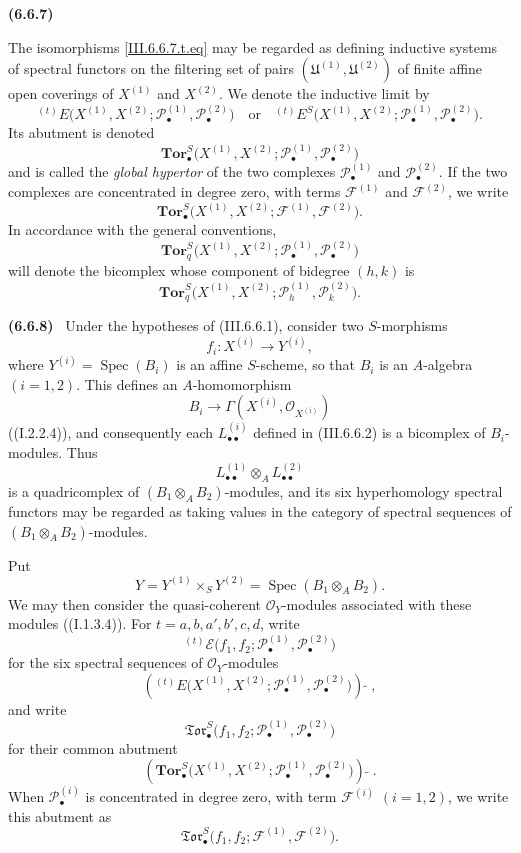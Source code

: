 \documentclass[10pt,oneside]{book}
\newcommand{\sh}[1]{\mathscr{#1}}
\newcommand{\supertilde}{{\,\widetilde{\,}\,}}
\newcommand{\Spec}{\operatorname{Spec}}
\newcommand{\sref}[2][]{(#2)}
\newcommand{\oldpage}[2][]{\setcounter{footnote}{0}\marginpar{\scriptsize\textbf{#1}~|~#2}\ignorespaces}
\newenvironment{env}[1][]{\par\medskip\noindent\textbf{(#1)}\ }{\par}
\begin{document}
\begin{env}[6.6.7]
\oldpage[III]{157}

The isomorphisms \eqref{III.6.6.7.t.eq} may be regarded as
defining inductive systems of spectral functors on the filtering
set of pairs
$(\mathfrak U^{(1)},\mathfrak U^{(2)})$ of finite affine open
coverings of $X^{(1)}$ and $X^{(2)}$.  We denote the inductive
limit by
\[
  {}^{(t)}E
  \bigl(
    X^{(1)},X^{(2)};
    \sh P_\bullet^{(1)},\sh P_\bullet^{(2)}
  \bigr)
  \quad\text{or}\quad
  {}^{(t)}E^S
  \bigl(
    X^{(1)},X^{(2)};
    \sh P_\bullet^{(1)},\sh P_\bullet^{(2)}
  \bigr).
\]
Its abutment is denoted
\[
  \mathbf{Tor}_\bullet^S
  \bigl(
    X^{(1)},X^{(2)};
    \sh P_\bullet^{(1)},\sh P_\bullet^{(2)}
  \bigr)
\]
and is called the \emph{global hypertor} of the two complexes
$\sh P_\bullet^{(1)}$ and $\sh P_\bullet^{(2)}$.  If the two
complexes are concentrated in degree zero, with terms
$\sh F^{(1)}$ and $\sh F^{(2)}$, we write
\[
  \mathbf{Tor}_\bullet^S
  \bigl(
    X^{(1)},X^{(2)};
    \sh F^{(1)},\sh F^{(2)}
  \bigr).
\]
In accordance with the general conventions,
\[
  \mathbf{Tor}_q^S
  \bigl(
    X^{(1)},X^{(2)};
    \sh P_\bullet^{(1)},\sh P_\bullet^{(2)}
  \bigr)
\]
will denote the bicomplex whose component of bidegree $(h,k)$ is
\[
  \mathbf{Tor}_q^S
  \bigl(
    X^{(1)},X^{(2)};
    \sh P_h^{(1)},\sh P_k^{(2)}
  \bigr).
\]
\end{env}

\begin{env}[6.6.8]
\label{III.6.6.8}
Under the hypotheses of \sref{III.6.6.1}, consider two
$S$-morphisms
\[
  f_i:X^{(i)}\longrightarrow Y^{(i)},
\]
where
$Y^{(i)}=\Spec(B_i)$ is an affine $S$-scheme, so that $B_i$ is
an $A$-algebra $(i=1,2)$.  This defines an $A$-homomorphism
\[
  B_i\longrightarrow
  \Gamma(X^{(i)},\sh O_{X^{(i)}})
\]
(\sref[I]{I.2.2.4}), and consequently each
$L_{\bullet\bullet}^{(i)}$ defined in \sref{III.6.6.2} is a
bicomplex of $B_i$-modules.  Thus
\[
  L_{\bullet\bullet}^{(1)}
  \otimes_A L_{\bullet\bullet}^{(2)}
\]
is a quadricomplex of $(B_1\otimes_AB_2)$-modules, and its six
hyperhomology spectral functors may be regarded as taking values
in the category of spectral sequences of
$(B_1\otimes_AB_2)$-modules.

Put
\[
  Y=Y^{(1)}\times_SY^{(2)}
   =\Spec(B_1\otimes_AB_2).
\]
We may then consider the quasi-coherent $\sh O_Y$-modules
associated with these modules (\sref[I]{I.1.3.4}).  For
$t=a,b,a',b',c,d$, write
\[
  {}^{(t)}\sh E
  \bigl(
    f_1,f_2;
    \sh P_\bullet^{(1)},\sh P_\bullet^{(2)}
  \bigr)
\]
for the six spectral sequences of $\sh O_Y$-modules
\[
  \left(
    {}^{(t)}E
    \bigl(
      X^{(1)},X^{(2)};
      \sh P_\bullet^{(1)},\sh P_\bullet^{(2)}
    \bigr)
  \right)\supertilde,
\]
and write
\[
  \mathfrak{Tor}_\bullet^S
  \bigl(
    f_1,f_2;
    \sh P_\bullet^{(1)},\sh P_\bullet^{(2)}
  \bigr)
\]
for their common abutment
\[
  \left(
    \mathbf{Tor}_\bullet^S
    \bigl(
      X^{(1)},X^{(2)};
      \sh P_\bullet^{(1)},\sh P_\bullet^{(2)}
    \bigr)
  \right)\supertilde.
\]
When $\sh P_\bullet^{(i)}$ is concentrated in degree zero, with
term $\sh F^{(i)}$ $(i=1,2)$, we write this abutment as
\[
  \mathfrak{Tor}_\bullet^S
  \bigl(
    f_1,f_2;
    \sh F^{(1)},\sh F^{(2)}
  \bigr).
\]
\end{env}
\end{document}
